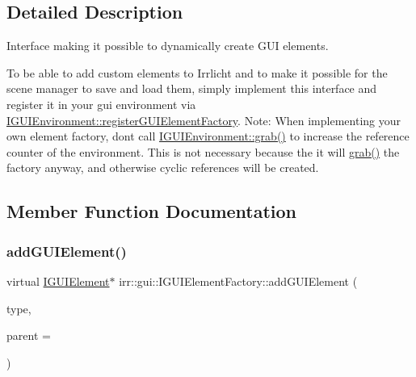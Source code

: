 \subsection{Detailed Description}
Interface making it possible to dynamically create G\+UI elements. 

To be able to add custom elements to Irrlicht and to make it possible for the scene manager to save and load them, simply implement this interface and register it in your gui environment via \hyperlink{classirr_1_1gui_1_1IGUIEnvironment_a653ac2cc8640899c23f4d55d9a5f0fdd}{I\+G\+U\+I\+Environment\+::register\+G\+U\+I\+Element\+Factory}. Note\+: When implementing your own element factory, don\textquotesingle{}t call \hyperlink{classirr_1_1IReferenceCounted_a396f9cdbe311ada278626477b3c6f0f5}{I\+G\+U\+I\+Environment\+::grab()} to increase the reference counter of the environment. This is not necessary because the it will \hyperlink{classirr_1_1IReferenceCounted_a396f9cdbe311ada278626477b3c6f0f5}{grab()} the factory anyway, and otherwise cyclic references will be created. 

\subsection{Member Function Documentation}
\mbox{\label{classirr_1_1gui_1_1IGUIElementFactory_aaaa0dda5493286ff745310b441347019}} 
\subsubsection{\texorpdfstring{add\+G\+U\+I\+Element()}{addGUIElement()}\hspace{0.1cm}{\footnotesize\ttfamily [1/4]}}
{\footnotesize\ttfamily virtual \hyperlink{classirr_1_1gui_1_1IGUIElement}{I\+G\+U\+I\+Element}$\ast$ irr\+::gui\+::\+I\+G\+U\+I\+Element\+Factory\+::add\+G\+U\+I\+Element (\begin{DoxyParamCaption}\item[{\hyperlink{namespaceirr_1_1gui_ae4d66df0ecf4117cdbcf9f22404bd254}{E\+G\+U\+I\+\_\+\+E\+L\+E\+M\+E\+N\+T\+\_\+\+T\+Y\+PE}}]{type,  }\item[{\hyperlink{classirr_1_1gui_1_1IGUIElement}{I\+G\+U\+I\+Element} $\ast$}]{parent = {} }\end{DoxyParamCaption})\hspace{0.3cm}{\ttfamily [pure virtual]}}



